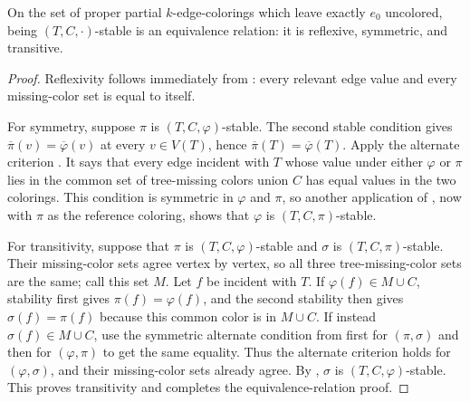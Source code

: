 \begin{lemma}
On the set of proper partial $k$-edge-colorings which leave exactly $e_0$
uncolored, being $(T,C,\mathord\cdot)$-stable is an equivalence relation:
it is reflexive, symmetric, and transitive.
\end{lemma}
\begin{proof}
Reflexivity follows immediately from : every
relevant edge value and every missing-color set is equal to itself.

For symmetry, suppose $\pi$ is $(T,C,\varphi)$-stable.  The second stable
condition gives
$\overline\pi(v)=\overline\varphi(v)$ at every $v\in V(T)$, hence
$\overline\pi(T)=\overline\varphi(T)$.  Apply the alternate criterion
.  It says that every edge incident with $T$ whose value under
either $\varphi$ or $\pi$ lies in the common set of tree-missing colors
union $C$ has equal values in the two colorings.  This condition is
symmetric in $\varphi$ and $\pi$, so another application of
, now with $\pi$ as the reference coloring, shows that
$\varphi$ is $(T,C,\pi)$-stable.

For transitivity, suppose that $\pi$ is $(T,C,\varphi)$-stable and $\sigma$
is $(T,C,\pi)$-stable.  Their missing-color sets agree vertex by vertex, so
all three tree-missing-color sets are the same; call this set $M$.  Let $f$
be incident with $T$.  If $\varphi(f)\in M\cup C$, stability first gives
$\pi(f)=\varphi(f)$, and the second stability then gives
$\sigma(f)=\pi(f)$ because this common color is in $M\cup C$.  If instead
$\sigma(f)\in M\cup C$, use the symmetric alternate condition from
 first for $(\pi,\sigma)$ and then for $(\varphi,\pi)$ to get
the same equality.  Thus the alternate criterion holds for
$(\varphi,\sigma)$, and their missing-color sets already agree.  By
, $\sigma$ is $(T,C,\varphi)$-stable.  This proves
transitivity and completes the equivalence-relation proof.
\end{proof}

